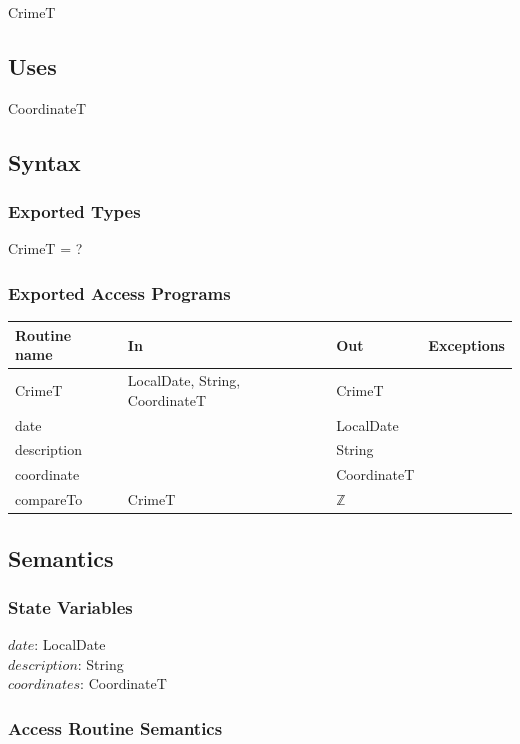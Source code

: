 \documentclass[12pt]{article}
\begin{document}
CrimeT

\subsection* {Uses}

CoordinateT

\subsection* {Syntax}

\subsubsection* {Exported Types}

CrimeT = ?

\subsubsection* {Exported Access Programs}

\begin{tabular}{| l | l | l | l |}
\hline
\textbf{Routine name} & \textbf{In} & \textbf{Out} & \textbf{Exceptions}\\
\hline
CrimeT & LocalDate, String, CoordinateT & CrimeT & \\
\hline
date & ~ & LocalDate & ~\\
\hline
description & ~ & String & ~\\
\hline
coordinate & ~ & CoordinateT & ~\\
\hline
compareTo & CrimeT & $\mathbb{Z}$ & ~\\
\hline
\end{tabular}

\subsection* {Semantics}

\subsubsection* {State Variables}

$date$: LocalDate\\
$description$: String\\
$coordinates$: CoordinateT


\subsubsection* {Access Routine Semantics}
\end{document}
